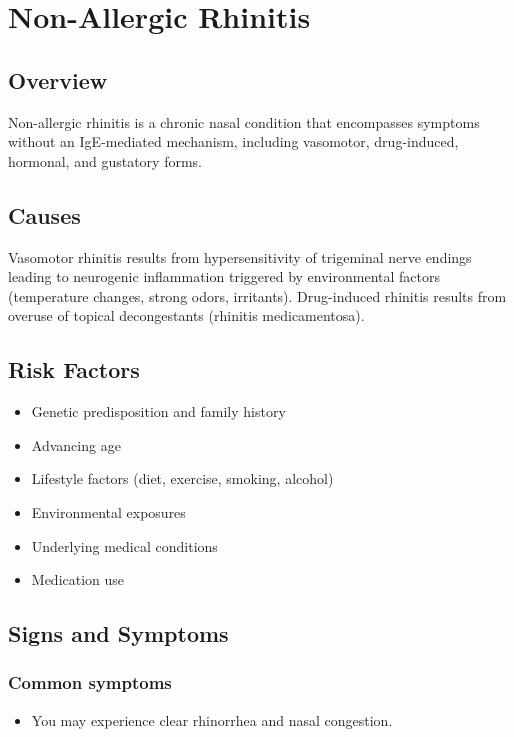 \chapter{Non-Allergic Rhinitis}
\label{sec:Non-Allergic Rhinitis}

\section{Overview}
Non-allergic rhinitis is a chronic nasal condition that encompasses symptoms without an IgE-mediated mechanism, including vasomotor, drug-induced, hormonal, and gustatory forms.
\section{Causes}
Vasomotor rhinitis results from hypersensitivity of trigeminal nerve endings leading to neurogenic inflammation triggered by environmental factors (temperature changes, strong odors, irritants). Drug-induced rhinitis results from overuse of topical decongestants (rhinitis medicamentosa).     
\section{Risk Factors}

\begin{itemize}[noitemsep]
  \item Genetic predisposition and family history
  \item Advancing age
  \item Lifestyle factors (diet, exercise, smoking, alcohol)
  \item Environmental exposures
  \item Underlying medical conditions
  \item Medication use
\end{itemize}
\section{Signs and Symptoms}

\subsection{Common symptoms}
\begin{itemize}[noitemsep]
  \item You may experience clear rhinorrhea and nasal congestion. 
  \end{itemize}


